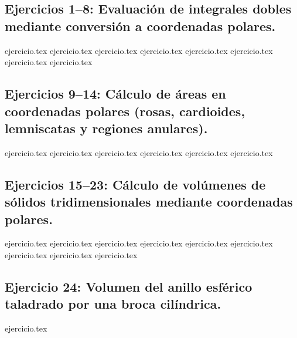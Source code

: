 
\subsection*{Ejercicios 1--8: Evaluación de integrales dobles mediante conversión a coordenadas polares.}
\begin{enumerate}
    {ejercicio.tex}
    {ejercicio.tex}
    {ejercicio.tex}
    {ejercicio.tex}
    {ejercicio.tex}
    {ejercicio.tex}
    {ejercicio.tex}
    {ejercicio.tex}
\end{enumerate}

\subsection*{Ejercicios 9--14: Cálculo de áreas en coordenadas polares (rosas, cardioides, lemniscatas y regiones anulares).}
\begin{enumerate}
    \setcounter{enumi}{8}
    {ejercicio.tex}
    {ejercicio.tex}
    {ejercicio.tex}
    {ejercicio.tex}
    {ejercicio.tex}
    {ejercicio.tex}
\end{enumerate}

\subsection*{Ejercicios 15--23: Cálculo de volúmenes de sólidos tridimensionales mediante coordenadas polares.}
\begin{enumerate}
    \setcounter{enumi}{14}
    {ejercicio.tex}
    {ejercicio.tex}
    {ejercicio.tex}
    {ejercicio.tex}
    {ejercicio.tex}
    {ejercicio.tex}
    {ejercicio.tex}
    {ejercicio.tex}
    {ejercicio.tex}
\end{enumerate}

\subsection*{Ejercicio 24: Volumen del anillo esférico taladrado por una broca cilíndrica.}
\begin{enumerate}
    \setcounter{enumi}{23}
    {ejercicio.tex}
\end{enumerate}

